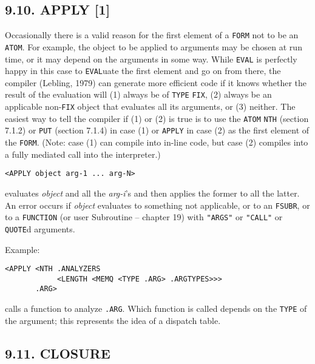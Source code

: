 \documentclass[a4paper,]{article}
\begin{document}
\subsection{9.10. APPLY {[}1{]}}\label{apply-1}

Occasionally there is a valid reason for the first element of a \texttt{FORM} not to be an \texttt{ATOM}. For example, the
object to be applied to arguments may be chosen at run time, or it may depend on the arguments in some way. While
\texttt{EVAL} is perfectly happy in this case to \texttt{EVAL}uate the first element and go on from there, the compiler
(Lebling, 1979) can generate more efficient code if it knows whether the result of the evaluation will (1) always be of
\texttt{TYPE} \texttt{FIX}, (2) always be an applicable non-\texttt{FIX} object that evaluates all its arguments, or (3)
neither. The easiest way to tell the compiler if (1) or (2) is true is to use the \texttt{ATOM}
\texttt{NTH} (section 7.1.2) or \texttt{PUT} (section 7.1.4) in case (1) or
\texttt{APPLY} in case (2) as the first element of the \texttt{FORM}. (Note: case (1) can compile into in-line code, but
case (2) compiles into a fully mediated call into the interpreter.)

\begin{verbatim}
<APPLY object arg-1 ... arg-N>
\end{verbatim}

 evaluates \emph{object} and all the \emph{arg-i}'s and then applies the former to all the
latter. An error occurs if \emph{object} evaluates to something not applicable, or to an \texttt{FSUBR}, or to a
\texttt{FUNCTION} (or user Subroutine -- chapter 19) with \texttt{"ARGS"} or \texttt{"CALL"} or \texttt{QUOTE}d arguments.

Example:

\begin{verbatim}
<APPLY <NTH .ANALYZERS
            <LENGTH <MEMQ <TYPE .ARG> .ARGTYPES>>>
       .ARG>
\end{verbatim}

calls a function to analyze \texttt{.ARG}. Which function is called depends on the \texttt{TYPE} of the argument; this
represents the idea of a dispatch table.

\subsection{9.11. CLOSURE}\label{closure}
\end{document}
